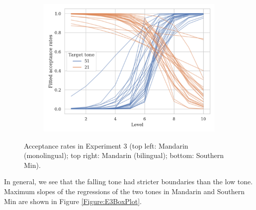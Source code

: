 \begin{figure}[hbt!]
\begin{subfigure}[b]{.45\textwidth}
\end{subfigure}
\hfill
\begin{subfigure}[b]{.45\textwidth}
\centering
\includegraphics[width=\textwidth]{figures/E3/Min_E3_raw.png}
\end{subfigure}
\caption{Acceptance rates in Experiment 3 (top left: Mandarin (monolingual); top right: Mandarin (bilingual); bottom: Southern Min).}
\label{Figure:E3Raw}
\end{figure}

In general, we see that the falling tone had stricter boundaries than the low tone. Maximum slopes of the regressions of the two tones in Mandarin and Southern Min are shown in Figure \ref{Figure:E3BoxPlot}.

